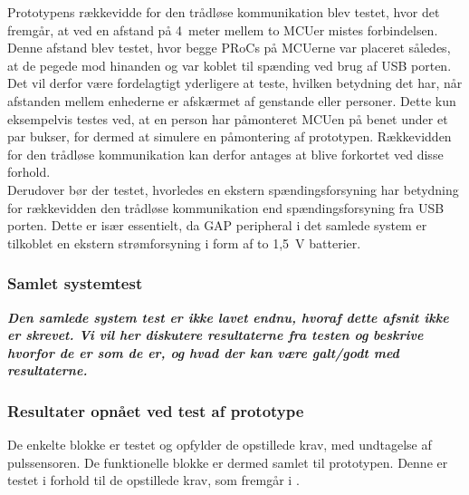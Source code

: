 Prototypens rækkevidde for den trådløse kommunikation blev testet, hvor det fremgår, at ved en afstand på 4~meter mellem to MCUer mistes forbindelsen. Denne afstand blev testet, hvor begge PRoCs på MCUerne var placeret således, at de pegede mod hinanden og var koblet til spænding ved brug af USB porten. Det vil derfor være fordelagtigt yderligere at teste, hvilken betydning det har, når afstanden mellem enhederne er afskærmet af genstande eller personer. Dette kun eksempelvis testes ved, at en person har påmonteret MCUen på benet under et par bukser, for dermed at simulere en påmontering af prototypen. Rækkevidden for den trådløse kommunikation kan derfor antages at blive forkortet ved disse forhold. \\
Derudover bør der testet, hvorledes en ekstern spændingsforsyning har betydning for rækkevidden den trådløse kommunikation end spændingsforsyning fra USB porten. Dette er især essentielt, da GAP peripheral i det samlede system er tilkoblet en ekstern strømforsyning i form af to 1,5~V batterier.

\subsubsection{Samlet systemtest}
\textbf{\textit{Den samlede system test er ikke lavet endnu, hvoraf dette afsnit ikke er skrevet. Vi vil her diskutere resultaterne fra testen og beskrive hvorfor de er som de er, og hvad der kan være galt/godt med resultaterne.}} \\

\subsubsection{Resultater opnået ved test af prototype}
De enkelte blokke er testet og opfylder de opstillede krav, med undtagelse af pulssensoren. De funktionelle blokke er dermed samlet til prototypen. Denne er testet i forhold til de opstillede krav, som fremgår i .

